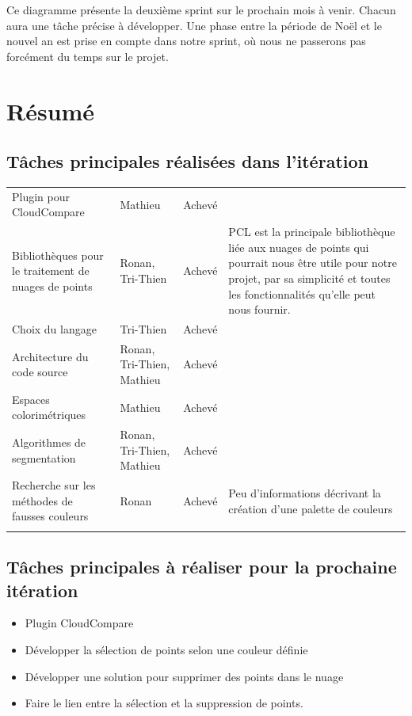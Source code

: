\documentclass[12pt,titlepage,french]{article}
\begin{document}
Ce diagramme présente la deuxième sprint sur le prochain mois à venir. Chacun aura une tâche précise à développer. Une phase entre la période de Noël et le nouvel an est prise en compte dans notre sprint, où nous ne passerons pas forcément du temps sur le projet. 

\section{Résumé}
\subsection{Tâches principales réalisées dans l'itération}
\noindent\begin{tabu} to \toprule
  &&&\\\toprule
Plugin pour CloudCompare
& Mathieu
& Achevé
& \\\midrule
Bibliothèques pour le traitement de nuages de points
& Ronan, Tri-Thien
& Achevé
& PCL est la principale bibliothèque liée aux nuages de points qui pourrait nous être utile pour notre projet, par sa simplicité et toutes les fonctionnalités qu'elle peut nous fournir.\\\midrule
Choix du langage
& Tri-Thien
& Achevé
& \\\midrule
Architecture du code source
& Ronan, Tri-Thien, Mathieu
& Achevé
& \\\midrule
Espaces colorimétriques
& Mathieu
& Achevé
& \\\midrule
Algorithmes de segmentation
& Ronan, Tri-Thien, Mathieu
& Achevé
& \\\midrule
Recherche sur les méthodes de fausses couleurs
& Ronan
& Achevé
& Peu d'informations décrivant la création d'une palette de couleurs\\\bottomrule  \\
\end{tabu}

\subsection{Tâches principales à réaliser pour la prochaine itération}
\begin{itemize}
  \item Plugin CloudCompare
  \item Développer la sélection de points selon une couleur définie
  \item Développer une solution pour supprimer des points dans le nuage
  \item Faire le lien entre la sélection et la suppression de points.
\end{itemize}
\end{document}
